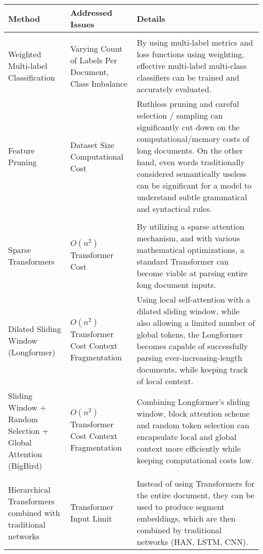 \documentclass[preprint,review,10pt]{elsarticle}
\begin{document}
	\begin{table}
		\scriptsize
		\begin{tabular}
			{ |p{3cm}|p{3cm}|p{9cm}|  }
			\hline
			\cellcolor{blue!25}\textbf{Method} & \cellcolor{blue!25}\textbf{Addressed Issues} & \cellcolor{blue!25}\textbf{Details}\\
			\hline \rowcolor{lightgray}
			\multicolumn{3}{|c|}{Metrics \& Preprocessing} \\
			\hline
			Weighted Multi-label Classification \cite{sicong}  & Varying Count of Labels Per Document, Class Imbalance & By using multi-label metrics and loss functions using weighting, effective multi-label multi-class classifiers can be trained and accurately evaluated.\\
			\hline
			Feature Pruning \cite{sicong, worsham} & Dataset Size \break \break Computational Cost & Ruthless pruning and careful selection / sampling can significantly cut down on the computational/memory costs of long documents. On the other hand, even words traditionally considered semantically useless can be significant for a model to understand subtle grammatical and syntactical rules.\\
			\hline
			\rowcolor{lightgray}
			\multicolumn{3}{|c|}{Sparse Attention Transformers} \\
			\hline
			Sparse Transformers \cite{child} & $O(n^2)$ Transformer Cost & By utilizing a sparse attention mechanism, and with various mathematical optimizations, a standard Transformer can become viable at parsing entire long document inputs.\\
			\hline
			Dilated Sliding Window (Longformer) \cite{longformer} & $O(n^2)$ Transformer Cost \break\break Context Fragmentation & Using local self-attention with a dilated sliding window, while also allowing a limited number of global tokens, the Longformer becomes capable of successfully parsing ever-increasing-length documents, while keeping track of local context.\\
			\hline
			Sliding Window + Random Selection + Global Attention (BigBird) \cite{big_bird} & $O(n^2)$ Transformer Cost \break\break Context Fragmentation & Combining Longformer's sliding window, block attention scheme and random token selection can encapsulate local and global context more efficiently while keeping computational costs low.\\
			\hline
			\rowcolor{lightgray}
			\multicolumn{3}{|c|}{Hierarchical Transformers} \\
			\hline
			Hierarchical Transformers combined with traditional networks \cite{ion_han, zichao, khandve, use} & Transformer Input Limit & Instead of using Transformers for the entire document, they can be used to produce segment embeddings, which are then combined by traditional networks (HAN, LSTM, CNN).\\

\end{tabular}
\end{table}
\end{document}
